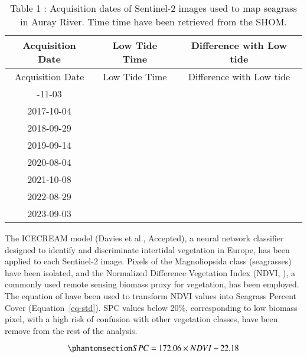 \documentclass[
  number]{elsarticle}
\begin{document}
\begin{longtable}[]{@{}ccc@{}}
\caption{Table 1 : Acquisition dates of Sentinel-2 images used to map
seagrass in Auray River. Time time have been retrieved from the
SHOM.}\tabularnewline
\toprule\noalign{}
Acquisition Date & Low Tide Time & Difference with Low tide \\
\midrule\noalign{}
\endfirsthead
\toprule\noalign{}
Acquisition Date & Low Tide Time & Difference with Low tide \\
\midrule\noalign{}
\endhead
\bottomrule\noalign{}
\endlastfoot
2016-11-03 & & \\
2017-10-04 & & \\
2018-09-29 & & \\
2019-09-14 & & \\
2020-08-04 & & \\
2021-10-08 & & \\
2022-08-29 & & \\
2023-09-03 & & \\
\end{longtable}

The ICECREAM model (Davies et al., Accepted), a neural network
classifier designed to identify and discriminate intertidal vegetation
in Europe, has been applied to each Sentinel-2 image. Pixels of the
Magnoliopsida class (seagrasses) have been isolated, and the Normalized
Difference Vegetation Index (NDVI, \citep{rouse1974monitoring}), a
commonly used remote sensing biomass proxy for vegetation, has been
employed. The equation of \citep{zoffoli2021decadal} have been used to
transform NDVI values into Seagrass Percent Cover
(Equation~\ref{eq-std}). SPC values below 20\%, corresponding to low
biomass pixel, with a high risk of confusion with other vegetation
classes, have been remove from the rest of the analysis.

\begin{equation}\phantomsection\label{eq-std}{
SPC = 172.06 \times NDVI - 22.18
}\end{equation}


  
\end{document}
